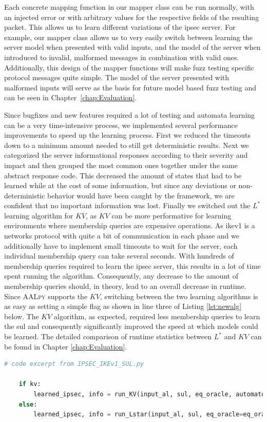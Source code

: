 Each concrete mapping function in our mapper class can be run normally, with an injected error or with arbitrary values for the respective fields of the resulting packet. This allows us to learn different variations of the \ac{ipsec} server. For example, our mapper class allows us to very easily switch between learning the server model when presented with valid inputs, and the model of the server when introduced to invalid, malformed messages in combination with valid ones. Additionally, this design of the mapper functions will make fuzz testing specific protocol messages quite simple. The model of the server presented with malformed inputs will serve as the basis for future model based fuzz testing and can be seen in Chapter~\ref{chap:Evaluation}.

Since bugfixes and new features required a lot of testing and automata learning can be a very time-intensive process, we implemented several performance improvements to speed up the learning process. First we reduced the timeouts down to a minimum amount needed to still get deterministic results. Next we categorized the server informational responses according to their severity and impact and then grouped the most common ones together under the same abstract response code. This decreased the amount of states that had to be learned while at the cost of some information, but since any deviations or non-deterministic behavior would have been caught by the framework, we are confident that no important information was lost. Finally we switched out the $L^*$ learning algorithm for $KV$, as $KV$ can be more performative for learning environments where membership queries are expensive operations. As \ac{ike}v1 is a networks protocol with quite a bit of communication in each phase and we additionally have to implement small timeouts to wait for the server, each individual membership query can take several seconds. With hundreds of membership queries required to learn the \ac{ipsec} server, this results in a lot of time spent running the algorithm. Consequently, any decrease to the amount of membership queries should, in theory, lead to an overall decrease in runtime. Since \textsc{AALpy} supports the $KV$, switching between the two learning algorithms is as easy as setting a simple flag as shown in line three of Listing \ref{lst:newalg} below. The $KV$ algorithm, as expected, required less membership queries to learn the \ac{sul} and consequently significantly improved the speed at which models could be learned. The detailed comparison of runtime statistics between $L^*$ and $KV$ can be found in Chapter \ref{chap:Evaluation}.

\begin{lstlisting}[float=ht, caption=Switching Learning Algorithms, label=lst:newalg, language=python]
	# code excerpt from IPSEC_IKEv1_SUL.py
	
	if kv:
		learned_ipsec, info = run_KV(input_al, sul, eq_oracle, automaton_type='mealy', cex_processing='rs')
	else:
		learned_ipsec, info = run_Lstar(input_al, sul, eq_oracle=eq_oracle, automaton_type='mealy', cache_and_non_det_check=True)
\end{lstlisting}
